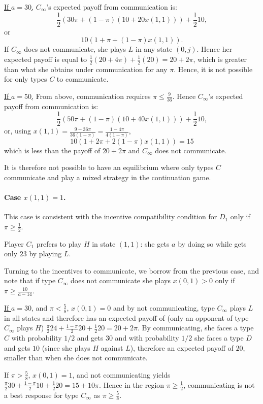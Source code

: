 \documentclass[12pt]{article}
\theoremstyle{definition}
\theoremstyle{remark}
\begin{document}
\underline{If $a=30$,} $C_\infty$'s expected payoff from communication is:
\[
\frac{1}{2}(30 \pi + (1-\pi)(10 + 20 x(1,1)))+\frac{1}{2} 10,
\]
or
\[
10(1+\pi+(1-\pi)x(1,1)).
\] 
If $C_\infty$ does not communicate, she plays $L$ in any state $(0,j)$. Hence her expected payoff is equal to $\frac{1}{2}(20+4\pi)+\frac{1}{2}(20)=20+2\pi$, which is greater than what she obtains under communication for any $\pi$. Hence, it is not possible for only types $C$ to communicate.

\underline{If $a=50$,} From above, communication requires $\pi\leq \frac{9}{36}$. Hence $C_\infty$'s expected payoff from communication is:
\[
\frac{1}{2}(50 \pi + (1-\pi)(10 + 40 x(1,1)))+\frac{1}{2} 10,
\]
or, using $x(1,1)=\frac{9-36\pi}{36(1-\pi)}=\frac{1-4\pi}{4(1-\pi)}$,
\[
10(1+2\pi+2(1-\pi)x(1,1))=15
\] 
which is less than the payoff of $20+2\pi$ and $C_\infty$ does not communicate.

It is therefore not possible to have an equilibrium where only types $C$ communicate and play a mixed strategy in the continuation game.

\paragraph{Case $x(1,1)=1$.} This case is consistent with the incentive compatibility condition for $D_1$ only if $\pi\geq \frac{1}{2}$. 

Player $C_1$ prefers to play $H$ in state $(1,1)$: she gets $a$ by doing so while gets only $23$ by playing $L$.

Turning to the incentives to communicate, we borrow from the previous case, and note that if type $C_\infty$ does not communicate she plays $x(0,1)>0$ only if $\pi\geq \frac{10}{a-14}$. 

\underline{If $a=30$}, and $\pi<\frac{5}{8}$, $x(0,1)=0$ and by not communicating, type $C_\infty$ plays $L$ in all states and therefore has an expected payoff of (only an opponent of type $C_\infty$ plays $H$)  $\frac{\pi}{2}24+\frac{1-\pi}{2}20+\frac{1}{2}20=20+2\pi$. By communicating, she faces a type $C$ with probability $1/2$ and gets $30$ and with probability $1/2$ she faces a type $D$ and gets $10$ (since she plays $H$ against $L$), therefore an expected payoff of $20$, smaller than when she does not communicate.

If $\pi> \frac{5}{8}$, $x(0,1)=1$, and not communicating yields $\frac{\pi}{2}30+\frac{1-\pi}{2}10+\frac{1}{2}20=15+10\pi$. Hence in the region $\pi\geq \frac{1}{2}$, communicating is not a best response for type $C_\infty$ as $\pi\geq\frac{5}{8}$.
\end{document}
